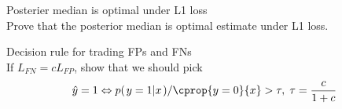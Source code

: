\documentclass[a4paper,twoside=false,abstract=false,numbers=noenddot,
titlepage=false,headings=small,parskip=half,version=last]{scrartcl}
\begin{document}

\begin{exercise}{5.1}
    
\end{exercise}
\begin{solution}
    
\end{solution}

\begin{exercise}{5.3} 
\end{exercise}
\begin{solution}

\end{solution}

\begin{exercise}{5.9} Posterier median is optimal under L1 loss\\
    Prove that the posterior median is optimal estimate under L1 loss.
\end{exercise}
\begin{solution}

\end{solution}

\begin{exercise}{5.10} Decision rule for trading FPs and FNs\\
    If $L_{FN}=cL_{FP}$, show that we should pick 
    \begin{equation}
        \hat{y}=1 \Leftrightarrow \cprob{y=1}{x}/\cprop{y=0}{x}>\tau,\;
        \tau=\frac{c}{1+c}
    \end{equation}
\end{exercise}
\begin{solution}
    
\end{solution}

\end{document}
